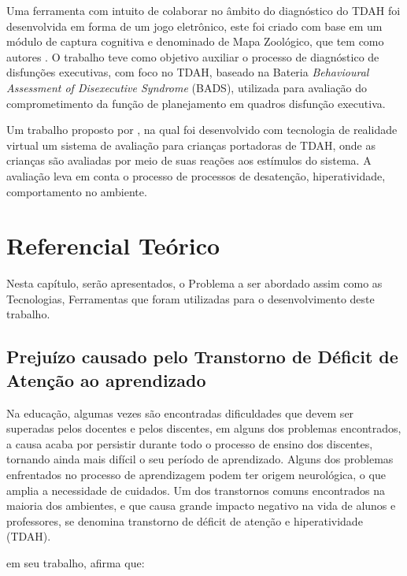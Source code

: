 \documentclass[
	12pt,				%
    oneside,			%
	a4paper,			%
	english,			%
	french,				%
	spanish,			%
	brazil,				%
	]{abntex2}
\begin{document}
	Uma ferramenta com intuito de colaborar no âmbito do diagnóstico do TDAH foi desenvolvida em forma de um jogo eletrônico, este foi criado com base em um módulo de captura cognitiva e denominado de Mapa Zoológico, que tem como autores . O trabalho teve como objetivo auxiliar o processo de diagnóstico de disfunções executivas, com foco no TDAH, baseado na Bateria \textit{Behavioural Assessment of Disexecutive Syndrome} (BADS), utilizada para avaliação do comprometimento da função de planejamento em quadros disfunção executiva. 
	
	Um trabalho proposto por , na qual foi desenvolvido com tecnologia de realidade virtual um sistema de avaliação para crianças portadoras de TDAH, onde as crianças são avaliadas por meio de suas reações aos estímulos do sistema. A avaliação leva em conta o processo de processos de desatenção, hiperatividade, comportamento no ambiente.




\chapter{Referencial Teórico}

	Nesta capítulo, serão apresentados, o Problema a ser abordado assim como as Tecnologias, Ferramentas que foram utilizadas para o desenvolvimento deste trabalho.

\section{Prejuízo causado pelo Transtorno de Déficit de Atenção ao aprendizado}

	Na educação, algumas vezes são encontradas dificuldades que devem ser superadas pelos docentes e pelos discentes, em alguns dos problemas encontrados, a causa acaba por persistir durante todo o processo de ensino dos discentes, tornando ainda mais difícil o seu período de aprendizado. Alguns dos problemas enfrentados no processo de aprendizagem podem ter origem neurológica, o que amplia a necessidade de cuidados. Um dos transtornos comuns encontrados na maioria dos ambientes, e que causa grande impacto negativo na vida de alunos e professores, se denomina transtorno de déficit de atenção e hiperatividade (TDAH).

	 em seu trabalho, afirma que:
\end{document}
